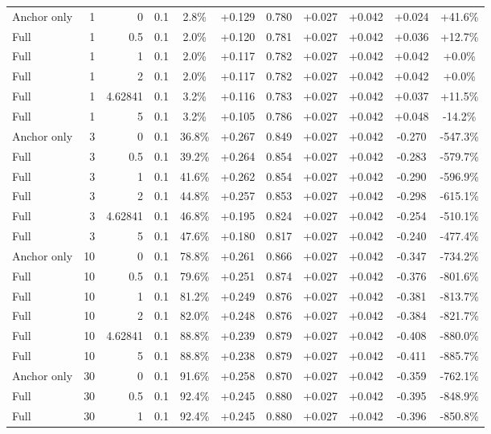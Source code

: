 \begin{table}[htbp]
\begin{tabular}{lrrrccccccc}
Anchor only & 1 & 0 & 0.1 & 2.8\% & +0.129 & 0.780 & +0.027 & +0.042 & +0.024 & +41.6\% \\
Full & 1 & 0.5 & 0.1 & 2.0\% & +0.120 & 0.781 & +0.027 & +0.042 & +0.036 & +12.7\% \\
Full & 1 & 1 & 0.1 & 2.0\% & +0.117 & 0.782 & +0.027 & +0.042 & +0.042 & +0.0\% \\
Full & 1 & 2 & 0.1 & 2.0\% & +0.117 & 0.782 & +0.027 & +0.042 & +0.042 & +0.0\% \\
Full & 1 & 4.62841 & 0.1 & 3.2\% & +0.116 & 0.783 & +0.027 & +0.042 & +0.037 & +11.5\% \\
Full & 1 & 5 & 0.1 & 3.2\% & +0.105 & 0.786 & +0.027 & +0.042 & +0.048 & -14.2\% \\
Anchor only & 3 & 0 & 0.1 & 36.8\% & +0.267 & 0.849 & +0.027 & +0.042 & -0.270 & -547.3\% \\
Full & 3 & 0.5 & 0.1 & 39.2\% & +0.264 & 0.854 & +0.027 & +0.042 & -0.283 & -579.7\% \\
Full & 3 & 1 & 0.1 & 41.6\% & +0.262 & 0.854 & +0.027 & +0.042 & -0.290 & -596.9\% \\
Full & 3 & 2 & 0.1 & 44.8\% & +0.257 & 0.853 & +0.027 & +0.042 & -0.298 & -615.1\% \\
Full & 3 & 4.62841 & 0.1 & 46.8\% & +0.195 & 0.824 & +0.027 & +0.042 & -0.254 & -510.1\% \\
Full & 3 & 5 & 0.1 & 47.6\% & +0.180 & 0.817 & +0.027 & +0.042 & -0.240 & -477.4\% \\
Anchor only & 10 & 0 & 0.1 & 78.8\% & +0.261 & 0.866 & +0.027 & +0.042 & -0.347 & -734.2\% \\
Full & 10 & 0.5 & 0.1 & 79.6\% & +0.251 & 0.874 & +0.027 & +0.042 & -0.376 & -801.6\% \\
Full & 10 & 1 & 0.1 & 81.2\% & +0.249 & 0.876 & +0.027 & +0.042 & -0.381 & -813.7\% \\
Full & 10 & 2 & 0.1 & 82.0\% & +0.248 & 0.876 & +0.027 & +0.042 & -0.384 & -821.7\% \\
Full & 10 & 4.62841 & 0.1 & 88.8\% & +0.239 & 0.879 & +0.027 & +0.042 & -0.408 & -880.0\% \\
Full & 10 & 5 & 0.1 & 88.8\% & +0.238 & 0.879 & +0.027 & +0.042 & -0.411 & -885.7\% \\
Anchor only & 30 & 0 & 0.1 & 91.6\% & +0.258 & 0.870 & +0.027 & +0.042 & -0.359 & -762.1\% \\
Full & 30 & 0.5 & 0.1 & 92.4\% & +0.245 & 0.880 & +0.027 & +0.042 & -0.395 & -848.9\% \\
Full & 30 & 1 & 0.1 & 92.4\% & +0.245 & 0.880 & +0.027 & +0.042 & -0.396 & -850.8\% \\

\end{tabular}
\end{table}
